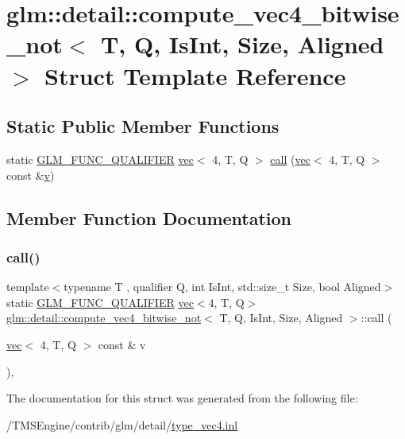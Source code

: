 \hypertarget{structglm_1_1detail_1_1compute__vec4__bitwise__not}{}\section{glm\+:\+:detail\+:\+:compute\+\_\+vec4\+\_\+bitwise\+\_\+not$<$ T, Q, Is\+Int, Size, Aligned $>$ Struct Template Reference}
\label{structglm_1_1detail_1_1compute__vec4__bitwise__not}
\subsection*{Static Public Member Functions}
\begin{DoxyCompactItemize}
\item 
static \hyperlink{setup_8hpp_a33fdea6f91c5f834105f7415e2a64407}{G\+L\+M\+\_\+\+F\+U\+N\+C\+\_\+\+Q\+U\+A\+L\+I\+F\+I\+ER} \hyperlink{structglm_1_1vec}{vec}$<$ 4, T, Q $>$ \hyperlink{structglm_1_1detail_1_1compute__vec4__bitwise__not_acbbd35ec67e0955a02cee35d6cfbb381}{call} (\hyperlink{structglm_1_1vec}{vec}$<$ 4, T, Q $>$ const \&\hyperlink{_s_d_l__opengl_8h_a10a82eabcb59d2fcd74acee063775f90}{v})
\end{DoxyCompactItemize}


\subsection{Member Function Documentation}
\mbox{\label{structglm_1_1detail_1_1compute__vec4__bitwise__not_acbbd35ec67e0955a02cee35d6cfbb381}} 
\subsubsection{\texorpdfstring{call()}{call()}}
{\footnotesize\ttfamily template$<$typename T , qualifier Q, int Is\+Int, std\+::size\+\_\+t Size, bool Aligned$>$ \\
static \hyperlink{setup_8hpp_a33fdea6f91c5f834105f7415e2a64407}{G\+L\+M\+\_\+\+F\+U\+N\+C\+\_\+\+Q\+U\+A\+L\+I\+F\+I\+ER} \hyperlink{structglm_1_1vec}{vec}$<$4, T, Q$>$ \hyperlink{structglm_1_1detail_1_1compute__vec4__bitwise__not}{glm\+::detail\+::compute\+\_\+vec4\+\_\+bitwise\+\_\+not}$<$ T, Q, Is\+Int, Size, Aligned $>$\+::call (\begin{DoxyParamCaption}\item[{\hyperlink{structglm_1_1vec}{vec}$<$ 4, T, Q $>$ const \&}]{v }\end{DoxyParamCaption})\hspace{0.3cm}{\ttfamily [inline]}, {\ttfamily [static]}}



The documentation for this struct was generated from the following file\+:\begin{DoxyCompactItemize}
\item 
/\+T\+M\+S\+Engine/contrib/glm/detail/\hyperlink{type__vec4_8inl}{type\+\_\+vec4.\+inl}\end{DoxyCompactItemize}
